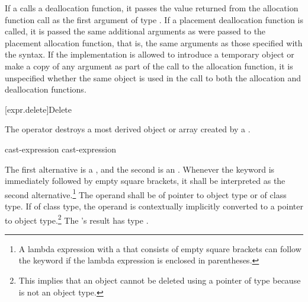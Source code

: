 \pnum
If a  calls a deallocation function, it passes
the value returned from the allocation function call as the first
argument of type . If a placement deallocation function is
called, it is passed the same additional arguments as were passed to the
placement allocation function, that is, the same arguments as those
specified with the  syntax.
If the implementation is allowed
to introduce a temporary object or make a copy of any argument
as part of the call to the allocation function,
it is unspecified whether the same object is used in the call
to both the allocation and deallocation functions.

[expr.delete]{Delete}

\pnum
{}%
%
The  operator destroys a most derived
object or array created by a
.

\begin{bnf}
\br
    \opt{\terminal{::}}  cast-expression\br
    \opt{\terminal{::}}  cast-expression
\end{bnf}

The first alternative is a
, and the
second is an .
Whenever the  keyword is immediately followed by empty square
brackets, it shall be interpreted as the second alternative.\footnote{A lambda
expression with a  that consists of empty square
brackets can follow the  keyword if the lambda expression is
enclosed in parentheses.}
The operand shall be of pointer to object type or of class type. If of
class type, the operand is contextually implicitly converted
to a pointer to object
type.\footnote{This implies that an object
cannot be deleted using a pointer of type
 because  is not an object type.}
The 's result has type
.

